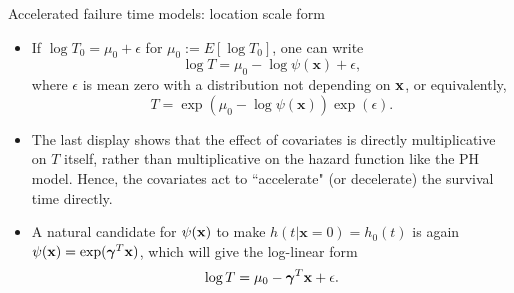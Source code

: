 \documentclass{beamer}
\newcommand{\boldgamma}{{\boldsymbol \gamma}}
\begin{document}
\begin{frame} {Accelerated failure time models: location scale form}
\begin{itemize}

\item If $\log T_0 = \mu_0 + \epsilon$ for $\mu_0  := E[ \log T_0]$, one can write
\begin{equation} \label{AFT_loc_scale}
\log T  = \mu_0 - \log \psi(\mathbf{x}) + \epsilon,
\end{equation}
where $\epsilon$ is mean zero with  a distribution not depending on $\bf x$, or equivalently,
\[
T = \exp(\mu_0 - \log \psi(\mathbf{x})) \exp(\epsilon).
 \]

\item  The last display shows that the effect of covariates is directly multiplicative on $T$ itself, rather than multiplicative on the hazard function like the PH model. Hence, the covariates act to ``accelerate" (or decelerate) the survival time directly.

\item A natural candidate for $\psi({\bf x})$ to make $h(t|\mathbf{x} = 0) = h_0(t)$ is again $\psi({\bf x}) = \exp(\boldgamma^T {\bf x} )$, which will give the log-linear form
\[
\log T  = \mu_0 - \boldgamma^T {\bf x}+ \epsilon.
\]
% 
\end{itemize}
\end{frame}
\end{document}
